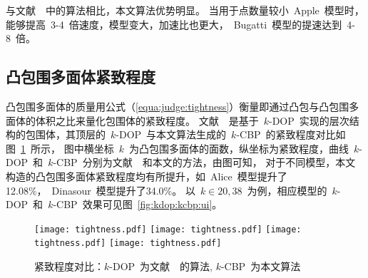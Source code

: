 与文献~~中的算法相比，本文算法优势明显。
当用于点数量较小~Apple~模型时，能够提高~3-4~倍速度，模型变大，加速比也更大，~Bugatti~模型的提速达到~4-8~倍。

\subsection{凸包围多面体紧致程度}
\label{subsec:exper:tightness}

凸包围多面体的质量用公式（\ref{equa:judge:tightness}）衡量即通过凸包与凸包围多面体的体积之比来量化包围体的紧致程度。
文献~~是基于~$k$-DOP~实现的层次结构的包围体，其顶层的~$k$-DOP~与本文算法生成的~$k$-CBP~的紧致程度对比如图~\ref{chart:exps:tightness}~所示，
图中横坐标~$k$~为凸包围多面体的面数，纵坐标为紧致程度，曲线~$k$-DOP~和~$k$-CBP~分别为文献~~和本文的方法，由图可知，
对于不同模型，本文构造的凸包围多面体紧致程度均有所提升，如~Alice~模型提升了12.08\%，~Dinasour~模型提升了34.0\%。
以~$k \in {20,38}$~为例，相应模型的~$k$-DOP~和~$k$-CBP~效果可见图~\ref{fig:kdop:kcbp:ui}。

\begin{figure}[htbp] 
\centering
{}
{
    \texttt{[image: tightness.pdf]}
}
{  
   \texttt{[image: tightness.pdf]}
}
\linebreak
{}
{  
    \texttt{[image: tightness.pdf]}
}
{  
   \texttt{[image: tightness.pdf]}
}
\caption{紧致程度对比：$k$-DOP~为文献~~的算法, $k$-CBP~为本文算法}
\label{chart:exps:tightness}
\end{figure}

